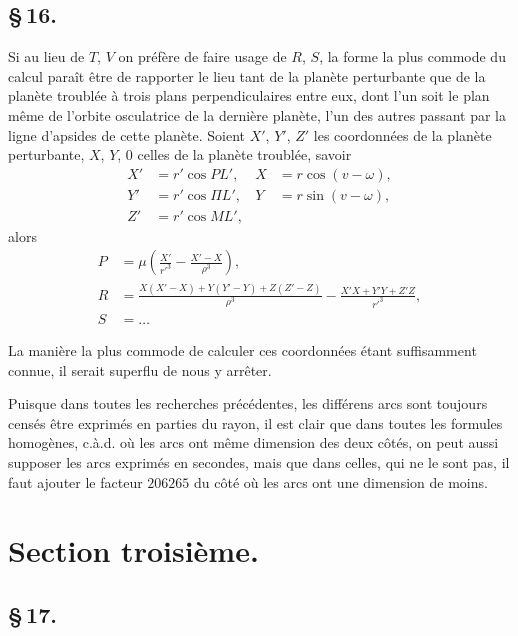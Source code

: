 \documentclass[12pt,a4paper]{article}
\begin{document}
\newpage
\subsection*{\S\,16.}

Si au lieu de $T$, $V$ on pr\'{e}f\`{e}re de faire usage de $R$, $S$, la forme la plus commode du calcul para\^{i}t \^{e}tre de rapporter le lieu tant de la plan\`{e}te perturbante que de la plan\`{e}te troubl\'{e}e \`{a} trois plans perpendiculaires entre eux, dont l'un soit le plan m\^{e}me de l'orbite osculatrice de la derni\`{e}re plan\`{e}te, l'un des autres passant par la ligne d'apsides de cette plan\`{e}te. Soient $X'$, $Y'$, $Z'$ les coordonn\'{e}es de la plan\`{e}te perturbante, $X$, $Y$, $0$ celles de la plan\`{e}te troubl\'{e}e, savoir
\begin{align}
X' &= r'\cos PL', & X &= r\cos(v - \omega), \tag{87} \\
Y' &= r'\cos \Pi L', & Y &= r\sin(v - \omega), \tag{88} \\
Z' &= r'\cos ML', & & \tag{89}
\end{align}
alors
\begin{align}
P &= \mu\left(\frac{X'}{r'^3} - \frac{X'-X}{\rho^3}\right), \tag{90} \\
R &= \frac{X(X'-X) + Y(Y'-Y) + Z(Z'-Z)}{\rho^3} - \frac{X'X + Y'Y + Z'Z}{r'^3}, \tag{91} \\
S &= \ldots \tag{92}
\end{align}

La mani\`{e}re la plus commode de calculer ces coordonn\'{e}es \'{e}tant suffisamment connue, il serait superflu de nous y arr\^{e}ter.

Puisque dans toutes les recherches pr\'{e}c\'{e}dentes, les diff\'{e}rens arcs sont toujours cens\'{e}s \^{e}tre exprim\'{e}s en parties du rayon, il est clair que dans toutes les formules homog\`{e}nes, c.\`{a}.d. o\`{u} les arcs ont m\^{e}me dimension des deux c\^{o}t\'{e}s, on peut aussi supposer les arcs exprim\'{e}s en secondes, mais que dans celles, qui ne le sont pas, il faut ajouter le facteur $206265$ du c\^{o}t\'{e} o\`{u} les arcs ont une dimension de moins.

\newpage
\section*{Section troisi\`{e}me.}

\subsection*{\S\,17.}
\end{document}

